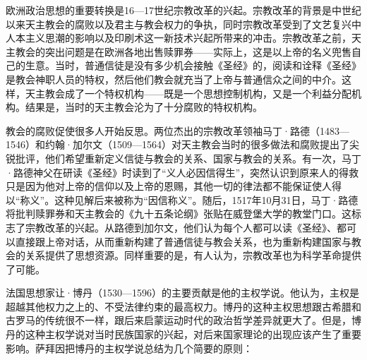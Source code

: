 欧洲政治思想的重要转换是16—17世纪宗教改革的兴起。宗教改革的背景是中世纪以来天主教会的腐败以及君主与教会权力的争执，同时宗教改革受到了文艺复兴中人本主义思潮的影响以及印刷术这一新技术兴起所带来的冲击。宗教改革之前，天主教会的突出问题是在欧洲各地出售赎罪券——实际上，这是以上帝的名义兜售自己的生意。当时，普通信徒是没有多少机会接触《圣经》的，阅读和诠释《圣经》是教会神职人员的特权，然后他们教会就充当了上帝与普通信众之间的中介。这样，天主教会成了一个特权机构——既是一个思想控制机构，又是一个利益分配机构。结果是，当时的天主教会沦为了十分腐败的特权机构。

教会的腐败促使很多人开始反思。两位杰出的宗教改革领袖马丁·路德（1483—1546）和约翰·加尔文（1509—1564）对天主教会当时的很多做法和腐败提出了尖锐批评，他们希望重新定义信徒与教会的关系、国家与教会的关系。有一次，马丁·路德神父在研读《圣经》时读到了“义人必因信得生”，突然认识到原来人的得救只是因为他对上帝的信仰以及上帝的恩赐，其他一切的律法都不能保证使人得以“称义”。这种见解后来被称为“因信称义”。随后，1517年10月31日，马丁·路德将批判赎罪券和天主教会的《九十五条论纲》张贴在威登堡大学的教堂门口。这标志了宗教改革的兴起。从路德到加尔文，他们认为每个人都可以读《圣经》、都可以直接跟上帝对话，从而重新构建了普通信徒与教会关系，也为重新构建国家与教会的关系提供了思想资源。同样重要的是，有人认为，宗教改革也为科学革命提供了可能。

法国思想家让·博丹（1530—1596）的主要贡献是他的主权学说。他认为，主权是超越其他权力之上的、不受法律约束的最高权力。博丹的这种主权思想跟古希腊和古罗马的传统很不一样，跟后来启蒙运动时代的政治哲学差异就更大了。但是，博丹的这种主权学说对当时民族国家的兴起，对后来国家理论的出现应该产生了重要影响。萨拜因把博丹的主权学说总结为几个简要的原则：


